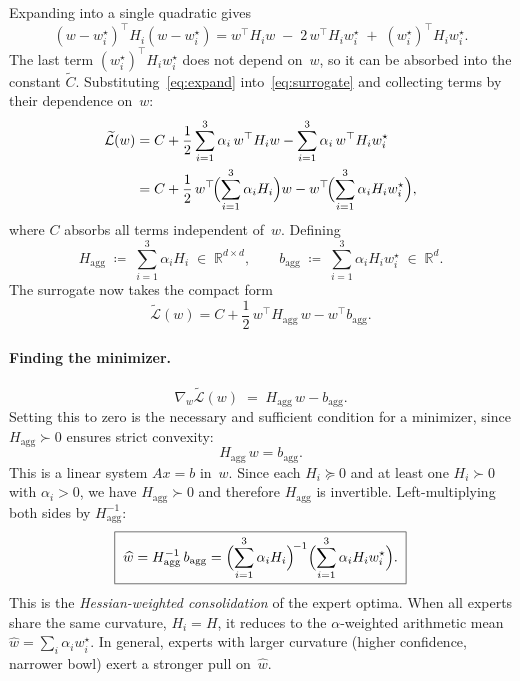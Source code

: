 \documentclass[11pt]{article}
\begin{document}
Expanding into a single quadratic gives
\begin{equation}
  (w - w_i^\star)^\top H_i (w - w_i^\star)
    = w^\top H_i w \;-\; 2\,w^\top H_i w_i^\star \;+\; (w_i^\star)^\top H_i w_i^\star.
  \label{eq:expand}
\end{equation}
The last term $(w_i^\star)^\top H_i w_i^\star$ does not depend on~$w$, so it can be
absorbed into the constant $\widetilde C$. Substituting~\eqref{eq:expand}
into~\eqref{eq:surrogate} and collecting terms by their dependence on~$w$:
\begin{align}
  \widetilde{\mathcal{L}}(w)
    &= C + \frac{1}{2}\sum_{i=1}^{3}\alpha_i\,w^\top H_i w
       - \sum_{i=1}^{3}\alpha_i\,w^\top H_i w_i^\star \notag\\
    &= C + \frac{1}{2}\,w^\top\!\Bigl(\sum_{i=1}^{3}\alpha_i H_i\Bigr)w
       - w^\top\!\Bigl(\sum_{i=1}^{3}\alpha_i H_i w_i^\star\Bigr),
  \label{eq:quadratic}
\end{align}
where $C$ absorbs all terms independent of~$w$. Defining
\begin{equation}
  H_{\mathrm{agg}} \;\coloneqq\; \sum_{i=1}^{3}\alpha_i H_i \;\in\;\mathbb{R}^{d\times d},
  \qquad
  b_{\mathrm{agg}} \;\coloneqq\; \sum_{i=1}^{3}\alpha_i H_i w_i^\star \;\in\;\mathbb{R}^d.
  \label{eq:agg}
\end{equation}
The surrogate now takes the compact form
\begin{equation}
  \widetilde{\mathcal{L}}(w) = C + \frac{1}{2}\,w^\top H_{\mathrm{agg}}\,w
    - w^\top b_{\mathrm{agg}}.
  \label{eq:compact}
\end{equation}

\paragraph{Finding the minimizer.}
\[
  \nabla_w \widetilde{\mathcal{L}}(w) \;=\; H_{\mathrm{agg}}\,w - b_{\mathrm{agg}}.
\]
Setting this to zero is the necessary and sufficient condition for a minimizer, since
$H_{\mathrm{agg}} \succ 0$ ensures strict convexity:
\[
  H_{\mathrm{agg}}\,w = b_{\mathrm{agg}}.
\]
This is a linear system $Ax = b$ in~$w$. Since each $H_i \succeq 0$ and at least one
$H_i \succ 0$ with $\alpha_i > 0$, we have $H_{\mathrm{agg}} \succ 0$ and therefore
$H_{\mathrm{agg}}$ is invertible. Left-multiplying both sides by $H_{\mathrm{agg}}^{-1}$:
\begin{equation}
  \boxed{\;\widehat w = H_{\mathrm{agg}}^{-1}\,b_{\mathrm{agg}}
    = \Bigl(\sum_{i=1}^{3}\alpha_i H_i\Bigr)^{\!-1}
      \Bigl(\sum_{i=1}^{3}\alpha_i H_i w_i^\star\Bigr).\;}
  \label{eq:whc}
\end{equation}
This is the \emph{Hessian-weighted consolidation} of the expert optima. When all
experts share the same curvature, $H_i = H$, it reduces to the $\alpha$-weighted
arithmetic mean $\widehat w = \sum_i \alpha_i w_i^\star$. In general, experts with
larger curvature (higher confidence, narrower bowl) exert a stronger pull on~$\widehat w$.
\end{document}
